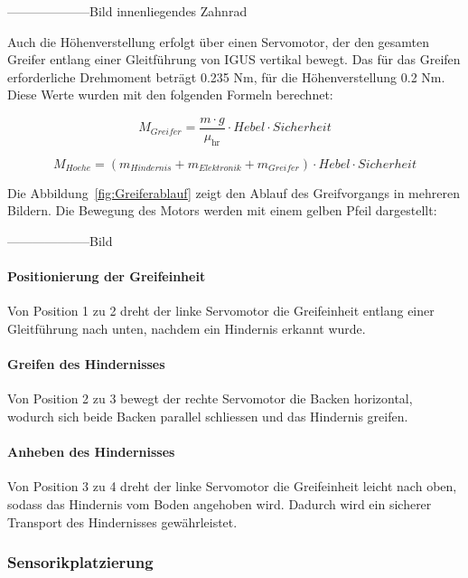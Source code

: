 \documentclass[main.tex]{subfiles} %
\begin{document}
--------------------Bild innenliegendes Zahnrad

Auch die Höhenverstellung erfolgt 
über einen Servomotor, der den gesamten Greifer entlang einer Gleitführung von IGUS vertikal bewegt. 
Das für das Greifen erforderliche Drehmoment beträgt 0.235 $ \text{Nm}$, 
für die Höhenverstellung 0.2 $\text{Nm}$. Diese Werte wurden mit den folgenden Formeln berechnet:

\[
    M_{Greifer} = \frac{m \cdot g}{\mu_{\text{hr}}} \cdot Hebel \cdot Sicherheit
\]

\[
    M_{Hoehe} = (m_{Hindernis} + m_{Elektronik} + m_{Greifer}) \cdot Hebel \cdot Sicherheit
\]

\newpage

Die Abbildung~\ref{fig:Greiferablauf} zeigt den Ablauf des Greifvorgangs in mehreren Bildern. 
Die Bewegung des Motors werden mit einem gelben Pfeil dargestellt:

--------------------Bild

\paragraph{Positionierung der Greifeinheit} 
Von Position 1 zu 2 dreht der linke Servomotor die Greifeinheit entlang einer Gleitführung 
nach unten, nachdem ein Hindernis erkannt wurde.

\paragraph{Greifen des Hindernisses} 

Von Position 2 zu 3 bewegt der rechte Servomotor die Backen horizontal, wodurch sich 
beide Backen parallel schliessen und das Hindernis greifen.

\paragraph{Anheben des Hindernisses} 

Von Position 3 zu 4 dreht der linke Servomotor die Greifeinheit leicht nach oben, sodass 
das Hindernis vom Boden angehoben wird. Dadurch wird ein sicherer Transport des Hindernisses gewährleistet.



\newpage

\subsubsection{Sensorikplatzierung}
\end{document}
